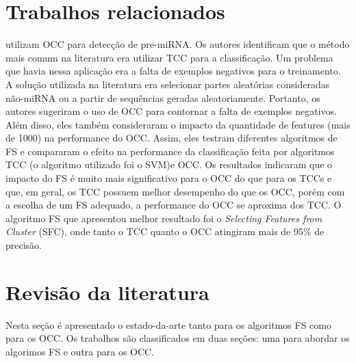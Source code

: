 \documentclass{paper}
\begin{document}
\section{Trabalhos relacionados} \label{sec_trabalhos_rel}
\citet{Khalifa2016} utilizam OCC para detecção de pre-miRNA. Os autores
identificam que o método mais comum na literatura era utilizar TCC para a
classificação. Um problema que havia nessa aplicação era a falta de exemplos
negativos para o treinamento.  A solução utilizada na literatura era selecionar
partes aleatórias consideradas não-miRNA ou a partir de sequências geradas
aleatoriamente.  Portanto, os autores sugeriram o uso de OCC para contornar a
falta de exemplos negativos.  Além disso, eles também consideraram o impacto da
quantidade de features (mais de 1000) na performance do OCC.  Assim, eles
testram diferentes algoritmos de FS e compararam o efeito na performance da
classificação feita por algoritmos TCC (o algoritmo utilizado foi o SVM)e
OCC. Os resultados indicaram que o impacto do FS é muito mais significativo para
o OCC do que para os TCCs e que, em geral, os TCC possuem melhor desempenho do
que os OCC, porém com a escolha de um FS adequado, a performance do OCC se
aproxima dos TCC. O algoritmo FS que apresentou melhor resultado foi o {\itshape
  Selecting Features from Cluster} (SFC), onde tanto o TCC quanto o OCC
atingiram mais de 95\% de precisão.

\section{Revisão da literatura} \label{sec_revisao}
Nesta seção é apresentado o estado-da-arte tanto para os algoritmos FS como para
os OCC. Os trabalhos são classificados em duas seções: uma para abordar os
algorimos FS e outra para os OCC.
\end{document}
